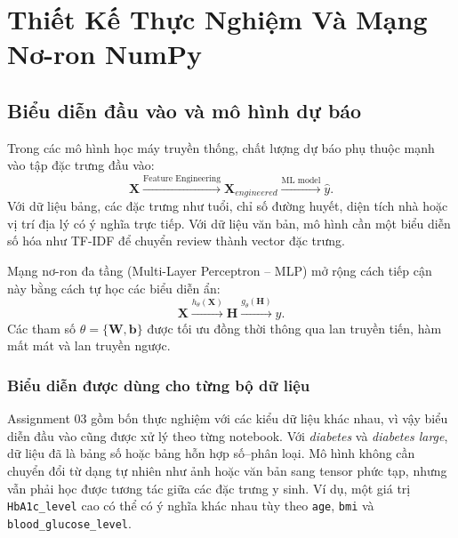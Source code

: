 \documentclass[12pt,a4paper]{report}
\begin{document}
\color{black}

\tableofcontents
\newpage
\listoffigures
\newpage
\listoftables
\newpage
{}

\chapter{Thiết Kế Thực Nghiệm Và Mạng Nơ-ron NumPy}

\section{Biểu diễn đầu vào và mô hình dự báo}
Trong các mô hình học máy truyền thống, chất lượng dự báo phụ thuộc mạnh vào tập đặc trưng đầu vào:
\begin{equation}
    \mathbf{X} \xrightarrow{\text{Feature Engineering}} \mathbf{X}_{engineered}
    \xrightarrow{\text{ML model}} \hat{y}.
\end{equation}
Với dữ liệu bảng, các đặc trưng như tuổi, chỉ số đường huyết, diện tích nhà hoặc vị trí địa lý có ý nghĩa trực tiếp. Với dữ liệu văn bản, mô hình cần một biểu diễn số hóa như TF-IDF để chuyển review thành vector đặc trưng.

Mạng nơ-ron đa tầng (Multi-Layer Perceptron -- MLP) mở rộng cách tiếp cận này bằng cách tự học các biểu diễn ẩn:
\begin{equation}
    \mathbf{X} \xrightarrow{h_{\theta}(\mathbf{X})} \mathbf{H}
    \xrightarrow{g_{\theta}(\mathbf{H})} \hat{y}.
\end{equation}
Các tham số $\theta = \{\mathbf{W}, \mathbf{b}\}$ được tối ưu đồng thời thông qua lan truyền tiến, hàm mất mát và lan truyền ngược.

\subsection{Biểu diễn được dùng cho từng bộ dữ liệu}
Assignment 03 gồm bốn thực nghiệm với các kiểu dữ liệu khác nhau, vì vậy biểu diễn đầu vào cũng được xử lý theo từng notebook.
Với \textit{diabetes} và \textit{diabetes large}, dữ liệu đã là bảng số hoặc bảng hỗn hợp số--phân loại.
Mô hình không cần chuyển đổi từ dạng tự nhiên như ảnh hoặc văn bản sang tensor phức tạp, nhưng vẫn phải học được tương tác giữa các đặc trưng y sinh.
Ví dụ, một giá trị \texttt{HbA1c\_level} cao có thể có ý nghĩa khác nhau tùy theo \texttt{age}, \texttt{bmi} và \texttt{blood\_glucose\_level}.
\end{document}
